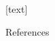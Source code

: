 \documentclass[presentation]{beamer}
\begin{document}

[text]
{\tiny \begin{frame}{References} 

\end{frame}}
\end{document}
